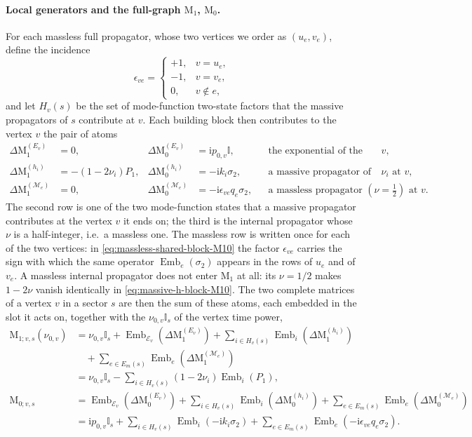 \documentclass[11pt,a4paper]{article}
\newcommand{\nn}{\nonumber}
\newcommand{\ii}{\mathrm i}
\newcommand{\Id}{\mathbb I}
\newcommand{\cE}{\mathcal E}
\newcommand{\cM}{\mathcal M}
\newcommand{\Emb}{\operatorname{Emb}}
\begin{document}
\paragraph{Local generators and the full-graph $\text{M}_1$, $\text{M}_0$.}
For each massless full propagator, whose two vertices we order as $(u_e,v_e)$, define the incidence
\begin{equation}
  \epsilon_{ve}=\begin{cases}+1,&v=u_e,\\-1,&v=v_e,\\0,&v\notin e,\end{cases}
  \label{eq:incidence}
\end{equation}
and let $H_v(s)$ be the set of mode-function two-state factors that the massive propagators of $s$ contribute at
$v$. Each building block then contributes to the vertex $v$ the pair of atoms
\begin{align}
  \Delta\text{M}_{1}^{(E_v)}&=0, & \Delta\text{M}_{0}^{(E_v)}&=\ii p_{0,v}\Id,
  &&\text{the exponential of the vertex }v,
  \label{eq:phase-block-M10}\\
  \Delta\text{M}_{1}^{(h_i)}&=-(1-2\nu_i)P_1, & \Delta\text{M}_{0}^{(h_i)}&=-\ii k_i\sigma_2,
  &&\text{a massive propagator of order }\nu_i\text{ at }v,
  \label{eq:massive-h-block-M10}\\
  \Delta\text{M}_{1}^{(\cM_e)}&=0, &
  \Delta\text{M}_{0}^{(\cM_e)}&=-\ii\epsilon_{ve}q_e\sigma_2,
  &&\text{a massless propagator }(\nu=\tfrac12)\text{ at }v.
  \label{eq:massless-shared-block-M10}
\end{align}
The second row is one of the two mode-function states that a massive propagator contributes at the vertex $v$ it
ends on; the third is the internal propagator whose $\nu$ is a half-integer, i.e.\ a massless one.
The massless row is written once for each of the two vertices: in
\eqref{eq:massless-shared-block-M10}
the factor $\epsilon_{ve}$ carries the sign with which the same operator $\Emb_e(\sigma_2)$ appears
in the rows of $u_e$ and of $v_e$. A massless internal propagator does not enter $\text{M}_1$ at
all: its $\nu=1/2$ makes $1-2\nu$ vanish identically in \eqref{eq:massive-h-block-M10}. The two
complete matrices of a vertex $v$ in a sector $s$ are then the sum of these atoms, each embedded in
the slot it acts on, together with the $\nu_{0,v}\Id_s$ of the vertex time power,
\begin{align}
  \text{M}_{1;v,s}(\nu_{0,v})
  &=\nu_{0,v}\Id_s+\Emb_{\cE_v}\!\left(\Delta\text{M}_{1}^{(E_v)}\right)
  +\sum_{i\in H_v(s)}\Emb_i\!\left(\Delta\text{M}_{1}^{(h_i)}\right)\nn\\
  &\quad+\sum_{e\in E_m(s)}\Emb_e\!\left(\Delta\text{M}_{1}^{(\cM_e)}\right)\nn\\
  &=\nu_{0,v}\Id_s-\sum_{i\in H_v(s)}(1-2\nu_i)\Emb_i(P_1),
  \label{eq:global-M1}\\
  \text{M}_{0;v,s}
  &=\Emb_{\cE_v}\!\left(\Delta\text{M}_{0}^{(E_v)}\right)
  +\sum_{i\in H_v(s)}\Emb_i\!\left(\Delta\text{M}_{0}^{(h_i)}\right)
  +\sum_{e\in E_m(s)}\Emb_e\!\left(\Delta\text{M}_{0}^{(\cM_e)}\right)\nn\\
  &=\ii p_{0,v}\Id_s+\sum_{i\in H_v(s)}\Emb_i(-\ii k_i\sigma_2)
  +\sum_{e\in E_m(s)}\Emb_e(-\ii\epsilon_{ve}q_e\sigma_2).
  \label{eq:global-M0}
\end{align}
\end{document}
